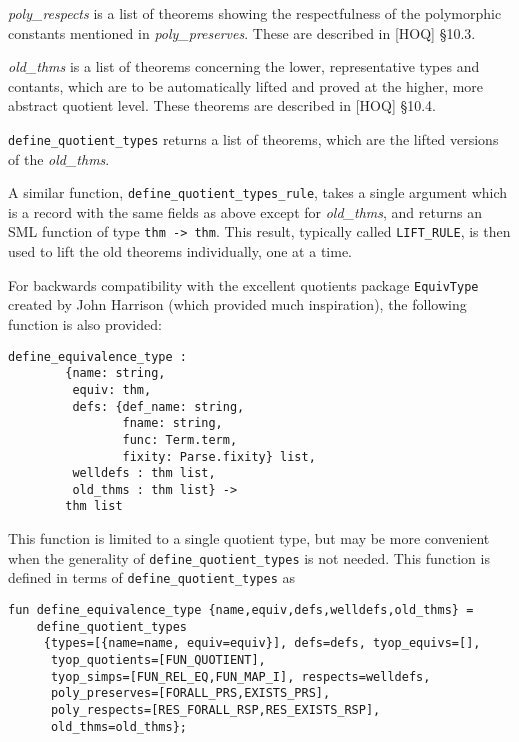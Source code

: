 {\it poly\_respects\/} is a list of theorems showing the respectfulness
of the polymorphic constants mentioned in {\it poly\_preserves}.
These are
described in
[HOQ] \S 10.3.

{\it old\_thms\/} is a list of theorems concerning the lower, representative
types and contants, which are to be automatically lifted and proved at the
higher, more abstract quotient level.
These theorems are described in
[HOQ] \S 10.4.

{\tt define\_quotient\_types} returns a list of theorems, which are the
lifted versions of the {\it old\_thms}.

A similar function,
{\tt define\_quotient\_types\_rule}, takes a single argument which is a
record with the same fields as above except for {\it old\_thms},
and returns an SML function of type {\tt thm -> thm}.
This result, typically called {\tt LIFT\_RULE},
is then used to lift the old theorems individually, one at a time.

For backwards compatibility with
the excellent quotients package
{\tt EquivType}
created by
John Harrison
(which provided much inspiration),
the following function is also provided:

\begin{hol}
\begin{verbatim}
define_equivalence_type :
        {name: string,
         equiv: thm,
         defs: {def_name: string,
                fname: string,
                func: Term.term,
                fixity: Parse.fixity} list,
         welldefs : thm list,
         old_thms : thm list} ->
        thm list
\end{verbatim}
\end{hol}
\noindent
This function is limited to a single quotient type, but may be
more convenient when the generality of {\tt define\_quotient\_types}
is not needed.
This function is defined in terms of {\tt define\_quotient\_types} as

\begin{hol}
\begin{verbatim}
fun define_equivalence_type {name,equiv,defs,welldefs,old_thms} =
    define_quotient_types
     {types=[{name=name, equiv=equiv}], defs=defs, tyop_equivs=[],
      tyop_quotients=[FUN_QUOTIENT],
      tyop_simps=[FUN_REL_EQ,FUN_MAP_I], respects=welldefs,
      poly_preserves=[FORALL_PRS,EXISTS_PRS],
      poly_respects=[RES_FORALL_RSP,RES_EXISTS_RSP],
      old_thms=old_thms};
\end{verbatim}
\end{hol}


